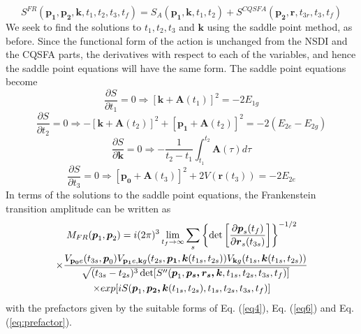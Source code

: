 \documentclass[11pt]{article}
\numberwithin{equation}{section}
\begin{document}
\begin{equation} \label{eq:FRANKAction}
    S^{FR}(\mathbf{p_1}, \mathbf{p_2}, \mathbf{k}, t_1, t_2, t_3, t_f) = S_A(\mathbf{p_1},\mathbf{k}, t_1, t_2) + S^{CQSFA} (\mathbf{p_2}, \mathbf{r}, t_{3r}, t_3, t_f)
\end{equation}
We seek to find the solutions to $t_1, t_2, t_3$ and $\mathbf{k}$ using the saddle point method, as before. Since the functional form of the action is unchanged from the NSDI and the CQSFA parts, the derivatives with respect to each of the variables, and hence the saddle point equations will have the same form. The saddle point equations become
\begin{equation}\label{eq:sad1}
    \frac{\partial S}{\partial t_1} = 0 \Rightarrow [\mathbf{k} + \mathbf{A}(t_1)]^2 = -2E_{1g}
\end{equation}
\begin{equation}
    \frac{\partial S}{\partial t_2} = 0 \Rightarrow -[\mathbf{k} + \mathbf{A}(t_2)]^2 + [\mathbf{p_1} + \mathbf{A}(t_2)]^2 = -2(E_{2e} - E_{2g})
\end{equation}
\begin{equation}
    \frac{\partial S}{\partial \mathbf{k}} = 0 \Rightarrow - \frac{1}{t_2 - t_1} \int_{t_1}^{t_2} \mathbf{A}(\tau) d\tau
\end{equation}
\begin{equation}\label{eq:sad4}
    \frac{\partial S}{\partial t_3} = 0 \Rightarrow [\mathbf{p_0} + \mathbf{A}(t_3)]^2 + 2 V(\mathbf{r}(t_3)) = -2E_{2e}
\end{equation}
\newline
In terms of the solutions to the saddle point equations, the Frankenstein transition amplitude can be written as
\begin{multline}
    M_{FR}(\boldsymbol{p}_{1} ,\boldsymbol{p}_{2}) =i{\displaystyle ( 2\pi )^{3}\lim _{t_{f}\rightarrow \infty }\sum _{s}\left\{\det\left[\frac{\partial \boldsymbol{p}_{s}( t_f)}{\partial \boldsymbol{r}_{s}( t_{3s})}\right]\right\}^{-1/2}} \\
    \times \frac{{\displaystyle } V_{\mathbf{p_0}e}( t_{3s} ,\boldsymbol{p}_{0}) V_{\mathbf{p_1}e,\mathbf{k}g}( t_{2s} ,\boldsymbol{p_1} ,\boldsymbol{k}( t_{1s} ,t_{2s})) V_{\mathbf{k}g}( t_{1s} ,\boldsymbol{k}( t_{1s} ,t_{2s}))}{\sqrt{( t_{3s} -t_{2s})^{3}\det[ S''(\boldsymbol{p}_{1} ,\boldsymbol{p_{s} ,r_{s} ,k} ,t_{1s} ,t_{2s} ,t_{3s} ,t_{f})]}} \\
    \times exp[iS(\boldsymbol{p}_{1} ,\boldsymbol{p_{2} ,k}( t_{1s} ,t_{2s}) ,t_{1s} ,t_{2s} ,t_{3s} ,t_{f})]
\end{multline}
with the prefactors given by the suitable forms of Eq. (\ref{eq4}), Eq. (\ref{eq6}) and Eq. (\ref{eq:prefactor}).
\end{document}
